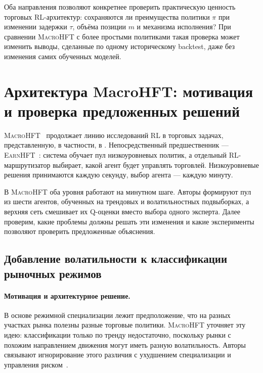 \documentclass[9pt,a4paper,twocolumn]{extarticle}
\newcommand{\Macro}{\textsc{MacroHFT}}
\newcommand{\Earn}{\textsc{EarnHFT}}
\begin{document}
Оба направления позволяют конкретнее проверить практическую ценность торговых RL-архитектур:
сохраняются ли преимущества политики $\pi$ при изменении задержки $\tau$, объёма позиции $m$ и
механизма исполнения? При сравнении \Macro{} с более простыми политиками такая проверка может
изменить выводы, сделанные по одному историческому backtest, даже без изменения самих обученных
моделей.

\section{Архитектура MacroHFT: мотивация и проверка предложенных решений}
\label{sec:method}

\Macro{}~\cite{zong2024macrohft} продолжает линию исследований RL в торговых задачах,
представленную, в частности, в \cite{deng2016deep,theate2021trading,zhu2022perturbation}.
Непосредственный предшественник --- \Earn{}~\cite{qin2024earnhft}: система обучает пул
низкоуровневых политик, а отдельный RL-маршрутизатор выбирает, какой агент будет управлять
торговлей. Низкоуровневые решения принимаются каждую секунду, выбор агента --- каждую минуту.

В \Macro{} оба уровня работают на минутном шаге. Авторы формируют пул из шести агентов,
обученных на трендовых и волатильностных подвыборках, а верхняя сеть смешивает их Q-оценки
вместо выбора одного эксперта. Далее проверим, какие проблемы должны решать эти изменения и
какие эксперименты позволяют проверить предложенные объяснения.

\subsection{Добавление волатильности к классификации рыночных режимов}
\label{sec:regime_decomposition}

\paragraph{Мотивация и архитектурное решение.}

В основе режимной специализации лежит предположение, что на разных участках рынка полезны разные
торговые политики. \Macro{} уточняет эту идею: классификации только по тренду недостаточно,
поскольку рынки с похожим направлением движения могут иметь разную волатильность. Авторы
связывают игнорирование этого различия с ухудшением специализации и управления
риском~\cite{zong2024macrohft}.
\end{document}
